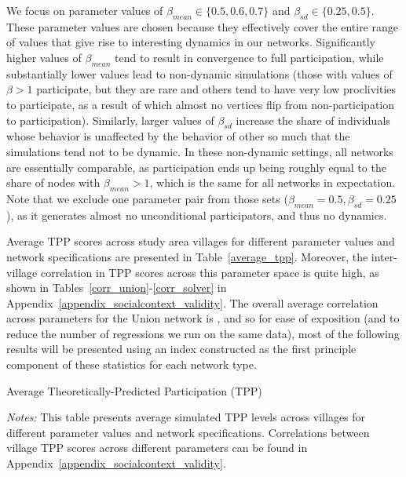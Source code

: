 \documentclass[12pt]{article}
\begin{document}
We focus on parameter values of $\beta_{mean} \in \{0.5, 0.6, 0.7\}$ and $\beta_{sd} \in \{0.25, 0.5\}$. These parameter values are chosen because they effectively cover the entire range of values that give rise to interesting dynamics in our networks. Significantly higher values of $\beta_{mean}$ tend to result in convergence to full participation, while substantially lower values lead to non-dynamic simulations (those with values of $ \beta > 1$ participate, but they are rare and others tend to have very low proclivities to participate, as a result of which almost no vertices flip from non-participation to participation). Similarly, larger values of $\beta_{sd}$ increase the share of individuals whose behavior is unaffected by the behavior of other so much that the simulations tend not to be dynamic. In these non-dynamic settings, all networks are essentially comparable, as participation ends up being roughly equal to the share of nodes with $\beta_{mean} > 1$, which is the same for all networks in expectation. Note that we exclude one parameter pair from those sets ($\beta_{mean}=0.5, \beta_{sd}=0.25$), as it generates almost no unconditional participators, and thus no dynamics.

Average TPP scores across study area villages for different parameter values and network specifications are presented in Table~\ref{average_tpp}. Moreover, the inter-village correlation in TPP scores across this parameter space is quite high, as shown in Tables~\ref{corr_union}-\ref{corr_solver} in Appendix~\ref{appendix_socialcontext_validity}. The overall average correlation across parameters for the Union network is \unskip, and so for ease of exposition (and to reduce the number of regressions we run on the same data), most of the following results will be presented using an index constructed as the first principle component of these statistics for each network type.

\begin{table}
		\begin{center}
			\caption{Average Theoretically-Predicted Participation (TPP)}\label{average_tpp}
		    
		\end{center}
		\scriptsize{\emph{Notes:}  This table presents average simulated TPP levels across villages for different parameter values and network specifications. Correlations between village TPP scores across different parameters can be found in Appendix~\ref{appendix_socialcontext_validity}.}
\end{table}
\end{document}
